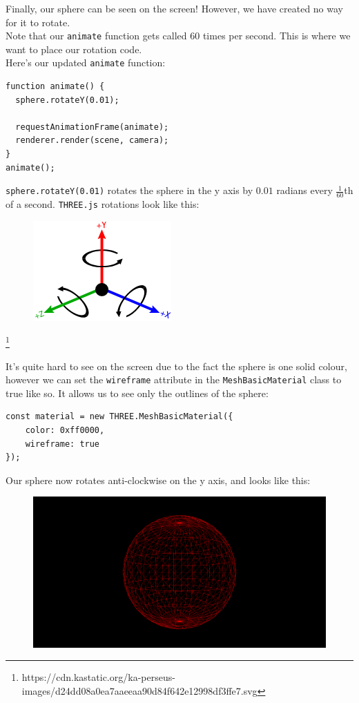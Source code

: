 Finally, our sphere can be seen on the screen! However, we have created no way for it to rotate. \\
Note that our \verb|animate| function gets called 60 times per second. This is where we want to place our rotation code. \\
\newpage
Here's our updated \verb|animate| function:
\begin{lstlisting}
function animate() {
  sphere.rotateY(0.01);

  requestAnimationFrame(animate);
  renderer.render(scene, camera);
}
animate();
\end{lstlisting}
\verb|sphere.rotateY(0.01)| rotates the sphere in the y axis by $0.01$ radians every $\frac{1}{60}$th of a second. \verb|THREE.js| rotations look like this:
\begin{figure}[h]
\centering
\includegraphics[width=0.3\linewidth]{images/setup_output4}
\caption{}
\label{fig:setupoutput4}
\end{figure}\footnote{https://cdn.kastatic.org/ka-perseus-images/d24dd08a0ea7aaeeaa90d84f642e12998df3ffe7.svg}

It's quite hard to see on the screen due to the fact the sphere is one solid colour, however we can set the \verb|wireframe| attribute in the \verb|MeshBasicMaterial| class to true like so. It allows us to see only the outlines of the sphere:
\begin{lstlisting}
const material = new THREE.MeshBasicMaterial({
	color: 0xff0000, 
	wireframe: true
});
\end{lstlisting}
Our sphere now rotates anti-clockwise on the y axis, and looks like this:
\begin{figure}[h]
\centering
\includegraphics[width=0.5\linewidth]{images/setup_output3}
\caption{}
\label{fig:setupoutput3}
\end{figure}

